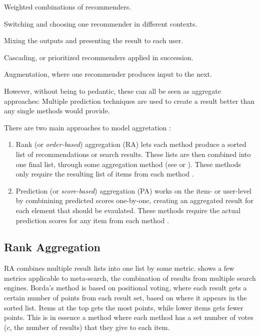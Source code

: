 \begin{itemize*}
  \item Weighted combinations of recommenders.
  \item Switching and choosing one recommender in different contexts.
  \item Mixing the outputs and presenting the result to each user.
  \item Cascading, or prioritized recommenders applied in succession.
  \item Augmentation, where one recommender produces input to the next.
\end{itemize*}

However, without being to pedantic, these can all be seen as aggregate approaches: Multiple prediction techniques are used
to create a result better than any single methods would provide.

There are two main approaches to model aggretation \cite[p1]{Liu2007}: 

\begin{enumerate}
  \item Rank (or \emph{order-based}) aggregation (RA) lets each method
  produce a sorted list of recommendations or search results. These lists are then combined
  into one final list, through some aggregation method (see \cite{Dwork2001} or \cite{Klementiev2008}).
  These methods only require the resulting list of items from each method \cite[p1]{Aslam2001}.

  \item Prediction (or \emph{score-based}) aggregation (PA) works on the item- or user-level by combinining predicted scores
  one-by-one, creating an aggregated result for each element that should be evaulated.
  These methods require the actual prediction scores for any item from each method \cite[p2]{Aslam2001}.
\end{enumerate}

\subsection{Rank Aggregation}
\label{sec:theory:rank}

RA combines multiple result lists into one list by some metric.
\cite{Dwork2001} shows a few metrics applicable to meta-search, the combination of results from multiple search engines.
Borda's method \cite[p6]{Dwork2001} is based on positional voting, where each result gets a certain number of points from each result set,
based on where it appears in the sorted list. Items at the top gets the most points, while lower items gets fewer points.
This is in essence a method where each method has a set number of votes ($c$, the number of results) that they give to each item.

